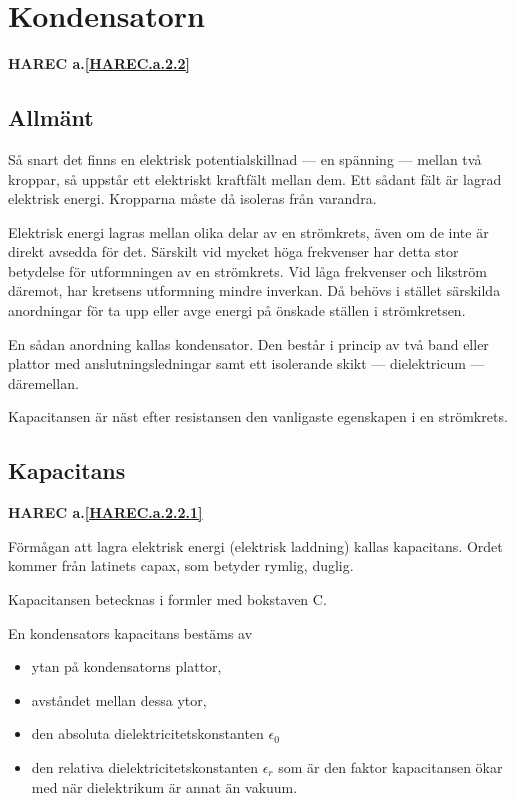 \section{Kondensatorn}
\textbf{HAREC a.\ref{HAREC.a.2.2}\label{myHAREC.a.2.2}}

\subsection{Allmänt}

Så snart det finns en elektrisk potentialskillnad --- en spänning --- mellan två
kroppar, så uppstår ett elektriskt kraftfält mellan dem. Ett sådant fält är
lagrad elektrisk energi. Kropparna måste då isoleras från varandra.

Elektrisk energi lagras mellan olika delar av en strömkrets, även om de inte är
direkt avsedda för det. Särskilt vid mycket höga frekvenser har detta stor
betydelse för utformningen av en strömkrets. Vid låga frekvenser och likström
däremot, har kretsens utformning mindre inverkan. Då behövs i stället särskilda
anordningar för ta upp eller avge energi på önskade ställen i strömkretsen.

En sådan anordning kallas kondensator. Den består i princip av två band eller
plattor med anslutningsledningar samt ett isolerande skikt --- dielektricum ---
däremellan.

Kapacitansen är näst efter resistansen den vanligaste egenskapen i en
strömkrets.

\subsection{Kapacitans}
\textbf{HAREC a.\ref{HAREC.a.2.2.1}\label{myHAREC.a.2.2.1}}

Förmågan att lagra elektrisk energi (elektrisk laddning) kallas kapacitans.
Ordet kommer från latinets capax, som betyder rymlig, duglig.

Kapacitansen betecknas i formler med bokstaven C.

En kondensators kapacitans bestäms av
\begin{itemize}
  \item ytan på kondensatorns plattor,
  \item avståndet mellan dessa ytor,
  \item den absoluta dielektricitetskonstanten \(\epsilon_0\)
  \item den relativa dielektricitetskonstanten \(\epsilon_r\) som är den faktor
kapacitansen ökar med när dielektrikum är annat än vakuum.
\end{itemize}


